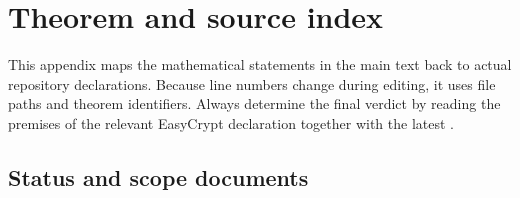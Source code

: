 \section{Theorem and source index}
\label{sec:source-index}

This appendix maps the mathematical statements in the main text back to actual
repository declarations. Because line numbers change during editing, it uses
file paths and theorem identifiers. Always determine the final verdict by reading
the premises of the relevant EasyCrypt declaration together with the latest
.

\subsection{Status and scope documents}

